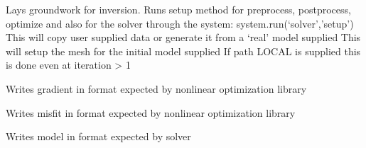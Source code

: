 \documentclass[letterpaper,10pt,english]{sphinxmanual}
\begin{document}
\begin{fulllineitems}

\begin{fulllineitems}
\label{\detokenize{ref/seisflows.workflow:seisflows.workflow.inversion.inversion.setup}}
Lays groundwork for inversion.
Runs setup method for preprocess, postprocess, optimize and also
for the solver through the system: system.run(‘solver’,’setup’)
This will copy user supplied data or generate it from a
‘real’ model supplied
This will setup the mesh for the initial model supplied
If path LOCAL is supplied this is done even at iteration \textgreater{} 1

\end{fulllineitems}


\begin{fulllineitems}
\label{\detokenize{ref/seisflows.workflow:seisflows.workflow.inversion.inversion.write_gradient}}
Writes gradient in format expected by nonlinear optimization
library

\end{fulllineitems}


\begin{fulllineitems}
\label{\detokenize{ref/seisflows.workflow:seisflows.workflow.inversion.inversion.write_misfit}}
Writes misfit in format expected by nonlinear optimization library

\end{fulllineitems}


\begin{fulllineitems}
\label{\detokenize{ref/seisflows.workflow:seisflows.workflow.inversion.inversion.write_model}}
Writes model in format expected by solver

\end{fulllineitems}


\end{fulllineitems}
\end{document}
